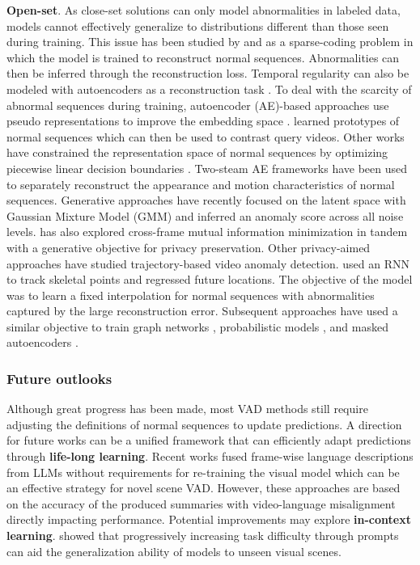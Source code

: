 \noindent
\textbf{Open-set}. As close-set solutions can only model abnormalities in labeled data, models cannot effectively generalize to distributions different than those seen during training. This issue has been studied by \citet{zhao2011online} and \citet{luo2017revisit} as a sparse-coding \citep{lee2006efficient} problem in which the model is trained to reconstruct normal sequences. Abnormalities can then be inferred through the reconstruction loss. Temporal regularity can also be modeled with autoencoders as a reconstruction task \citep{hasan2016learning}. To deal with the scarcity of abnormal sequences during training, autoencoder (AE)-based approaches use pseudo representations to improve the embedding space \citep{astrid2021synthetic,astrid2021learning}. \citet{park2020learning} learned prototypes of normal sequences which can then be used to contrast query videos. Other works have constrained the representation space of normal sequences by optimizing piecewise linear decision boundaries \citep{wang2019gods}. Two-steam AE frameworks \citep{cho2022unsupervised,nguyen2019anomaly} have been used to separately reconstruct the appearance and motion characteristics of normal sequences. Generative approaches \citep{micorek2024mulde} have recently focused on the latent space with Gaussian Mixture Model (GMM) and inferred an anomaly score across all noise levels. \citet{fioresi2023ted} has also explored cross-frame mutual information minimization in tandem with a generative objective for privacy preservation. Other privacy-aimed approaches have studied trajectory-based video anomaly detection. \citet{morais2019learning} used an RNN to track skeletal points and regressed future locations. The objective of the model was to learn a fixed interpolation for normal sequences with abnormalities captured by the large reconstruction error. Subsequent approaches have used a similar objective to train graph networks \citep{markovitz2020graph}, probabilistic models \citep{flaborea2023multimodal}, and masked autoencoders \citep{stergiou2024holistic}.


\subsubsection{Future outlooks}

Although great progress has been made, most VAD methods still require adjusting the definitions of normal sequences to update predictions. A direction for future works can be a unified framework that can efficiently adapt predictions through \textbf{life-long learning}. Recent works \citep{yang2024text,zanella2024harnessing} fused frame-wise language descriptions from LLMs without requirements for re-training the visual model which can be an effective strategy for novel scene VAD. However, these approaches are based on the accuracy of the produced summaries with video-language misalignment directly impacting performance. Potential improvements may explore \textbf{in-context learning}. \citet{zhao2024can} showed that progressively increasing task difficulty through prompts can aid the generalization ability of models to unseen visual scenes.
